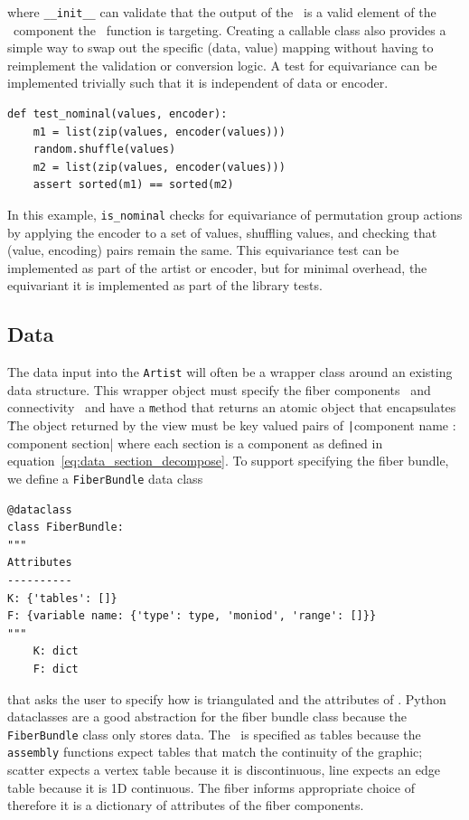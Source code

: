 \documentclass[../main.tex]{subfiles}
\begin{document}
where \texttt{__init__} can validate that the output of the \vchannel\ is a valid element of the \vfiber\ component the \vchannel\ function is targeting. Creating a callable class also provides a simple way to swap out the specific (data, value) mapping without having to reimplement the validation or conversion logic. A test for equivariance can be implemented trivially such that it is independent of data or encoder.
\begin{verbatim}
def test_nominal(values, encoder):
    m1 = list(zip(values, encoder(values)))
    random.shuffle(values)
    m2 = list(zip(values, encoder(values)))
    assert sorted(m1) == sorted(m2)
\end{verbatim}
In this example, \texttt{is_nominal} checks for equivariance of permutation group actions by applying the encoder to a set of values, shuffling values, and checking that (value, encoding) pairs remain the same. This equivariance test can be implemented as part of the artist or encoder, but for minimal overhead, the equivariant it is implemented as part of the library tests.

\subsection{Data \dtotal}
\label{sec:code_data}
The data input into the \texttt{Artist} will often be a wrapper class around an existing data structure. This wrapper object must specify the fiber components \dfiber\ and connectivity \dbase\ and have a \texttt method that returns an atomic object that encapsulates \dsection\. The object returned by the view must be key valued pairs of \texttt|{component name : component section}| where each section is a component as defined in equation~\ref{eq:data_section_decompose}. To support specifying the fiber bundle, we define a \texttt{FiberBundle} data class\cite{DataclassesDataClasses}

\begin{verbatim}
@dataclass
class FiberBundle:
"""
Attributes
----------
K: {'tables': []}
F: {variable name: {'type': type, 'moniod', 'range': []}}
"""
    K: dict 
    F: dict
\end{verbatim}

that asks the user to specify how \dbase is triangulated and the attributes of \dfiber. Python dataclasses are a good abstraction for the fiber bundle class because the \texttt{FiberBundle} class only stores data. The \dbase\ is specified as tables because the \texttt{assembly} functions expect tables that match the continuity of the graphic; scatter expects a vertex table because it is discontinuous, line expects an edge table because it is 1D continuous. The fiber informs appropriate choice of \vchannel\, therefore it is a dictionary of attributes of the fiber components. 
\end{document}
